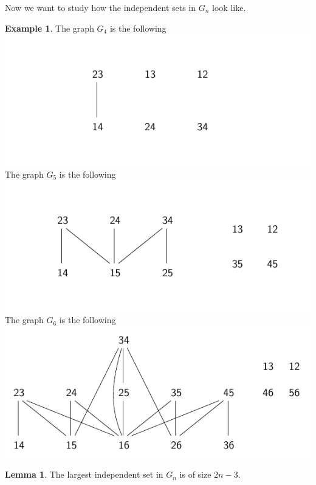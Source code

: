 \documentclass{scrartcl}
\theoremstyle{definition}
\newtheorem{lemma}[definition]{Lemma}
\newtheorem{example}[definition]{Example}
\begin{document}
Now we want to study how the independent sets in $G_n$ look like.
\begin{example}
    \label{ex:Gn}
    The graph $G_4$ is the following
    \\\includegraphics[width = \textwidth]{graph4.pdf}
    The graph $G_5$ is the following
    \\\includegraphics[width = \textwidth]{graph5.pdf}
    The graph $G_6$ is the following
    \\\includegraphics[width = \textwidth]{graph6.pdf}
\end{example}
\begin{lemma}
    The largest independent set in $G_n$ is of size $2n - 3$.
\end{lemma}
\end{document}
